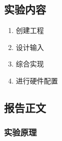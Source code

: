 \documentclass{ctexart}
\begin{document}
            \subsection{实验内容}
            
            \begin{enumerate}
                \item 创建工程
                \item 设计输入
                \item 综合实现
                \item 进行硬件配置
            \end{enumerate}
            
            \subsection{报告正文}
            
            \subsubsection{实验原理}
            
\end{document}

